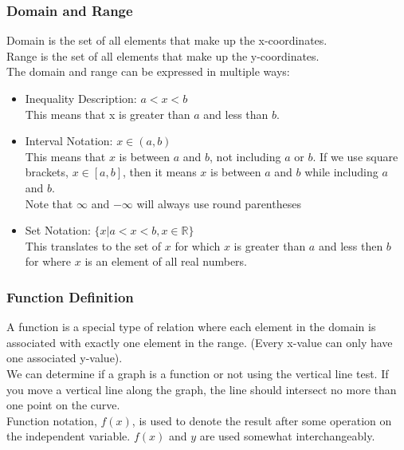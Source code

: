 \subsubsection{Domain and Range}
Domain is the set of all elements that make up the x-coordinates.\\
Range is the set of all elements that make up the y-coordinates.\\
The domain and range can be expressed in multiple ways:
\begin{itemize}
    \item Inequality Description: $a<x<b$\\
    This means that x is greater than $a$ and less than $b$.
    \item Interval Notation: $x\in (a,b)$\\
    This means that $x$ is between $a$ and $b$, not including $a$ or $b$. If we use square brackets, $x\in [a,b]$, then it means $x$ is between $a$ and $b$ while including $a$ and $b$.\\
    Note that $\infty$ and $-\infty$ will always use round parentheses
    \item Set Notation: $\{x|a<x<b,x\in\mathbb{R}\}$\\
    This translates to the set of $x$ for which $x$ is greater than $a$ and less then $b$ for where $x$ is an element of all real numbers.
\end{itemize}

\subsubsection{Function Definition}
A function is a special type of relation where each element in the domain is associated with exactly one element in the range. (Every x-value can only have one associated y-value).\\
We can determine if a graph is a function or not using the vertical line test. If you move a vertical line along the graph, the line should intersect no more than one point on the curve.\\
Function notation, $f(x)$, is used to denote the result after some operation on the independent variable. $f(x)$ and $y$ are used somewhat interchangeably.
